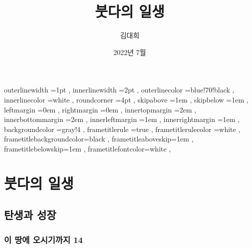 \documentclass[12pt, a4paper, oneside]{book}
\let\stdsection\section
\renewcommand\section{\newpage\stdsection}
\begin{document}
	
			\dominitoc
			\doparttoc			



			\title{붓다의 일생}
			\author{김대희}
			\date{2022년 7월}
			\maketitle


			\tableofcontents 		%
			\listoffigures 			%
			\cleardoublepage
			\listoftables 			%





		 {
						outerlinewidth		=1pt			,%
						innerlinewidth		=2pt			,%
						outerlinecolor		=blue!70!black	,%
						innerlinecolor		=white 			,%
						roundcorner			=4pt			,%
						skipabove			=1em 			,%
						skipbelow			=1em 			,%
						leftmargin			=0em			,%
						rightmargin			=0em			,%
						innertopmargin		=2em 			,%
						innerbottommargin 	=2em 			,%
						innerleftmargin		=1em 			,%
						innerrightmargin		=1em 			,%
						backgroundcolor		=gray!4			,%
						frametitlerule		=true 			,%
						frametitlerulecolor	=white			,%
						frametitlebackgroundcolor=black		,%
						frametitleaboveskip=1em 			,%
						frametitlebelowskip=1em 			,%
						frametitlefontcolor=white 			,%
						}



	\part{붓다의 일생}
	\noptcrule
	\parttoc				

%
%
%
\chapter{탄생과 성장}


%
	\section{이 땅에 오시기까지 14 }
\end{document}
